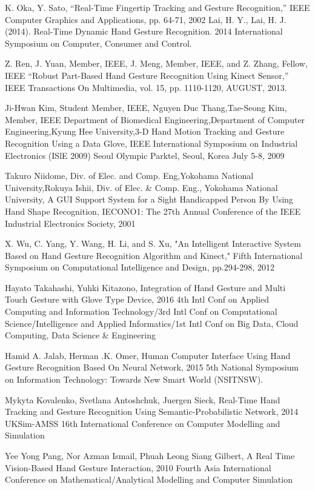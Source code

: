 \documentclass[11pt]{report}
\begin{document}
\begin{thebibliography}{999}

     K. Oka, Y. Sato, “Real-Time Fingertip Tracking and Gesture Recognition,” IEEE Computer Graphics and Applications, pp. 64-71, 2002
     Lai, H. Y., Lai, H. J. (2014). Real-Time Dynamic Hand Gesture Recognition. 2014 International Symposium on Computer, Consumer and Control. 
    
     Z. Ren, J. Yuan, Member, IEEE, J. Meng, Member, IEEE, and Z. Zhang, Fellow, IEEE “Robust Part-Based Hand Gesture Recognition Using Kinect Sensor,” IEEE Transactions On Multimedia, vol. 15, pp. 1110-1120, AUGUST, 2013.
    
     Ji-Hwan Kim, Student Member, IEEE, Nguyen Duc Thang,Tae-Seong Kim, Member, IEEE Department of Biomedical Engineering,Department of Computer Engineering,Kyung Hee University,3-D Hand Motion Tracking and Gesture Recognition
    Using a Data Glove, IEEE International Symposium on Industrial Electronics (ISlE 2009) Seoul Olympic Parktel, Seoul, Korea July 5-8, 2009
    
     Takuro Niidome, Div. of Elec. and Comp. Eng,Yokohama National University,Rokuya Ishii, Div. of Elec. \& Comp. Eng., Yokohama National University, A GUI Support System for a Sight Handicapped Person By Using Hand Shape Recognition, IECONO1: The 27th Annual Conference of the IEEE Industrial Electronics Society, 2001
    
     X. Wu, C. Yang, Y. Wang, H. Li, and S. Xu, "An Intelligent Interactive System Based on Hand Gesture Recognition Algorithm and Kinect," Fifth International Symposium on Computational Intelligence and Design, pp.294-298, 2012
    
     Hayato Takahashi, Yuhki Kitazono, Integration of Hand Gesture and Multi Touch Gesture with Glove Type Device, 2016 4th Intl Conf on Applied Computing and Information Technology/3rd Intl Conf on Computational Science/Intelligence and Applied Informatics/1st Intl Conf on Big Data, Cloud Computing, Data Science \& Engineering
    
     Hamid A. Jalab, Herman .K. Omer, Human Computer Interface Using Hand Gesture Recognition Based On Neural Network, 2015 5th National Symposium on Information Technology: Towards New Smart World (NSITNSW).
    
     Mykyta Kovalenko, Svetlana Antoshchuk, Juergen Sieck, Real-Time Hand Tracking and Gesture Recognition Using Semantic-Probabilistic Network, 2014 UKSim-AMSS 16th International Conference on Computer Modelling and Simulation
    
     Yee Yong Pang, Nor Azman Ismail, Phuah Leong Siang Gilbert, A Real Time Vision-Based Hand Gesture Interaction, 2010 Fourth Asia International Conference on Mathematical/Analytical Modelling and Computer Simulation
    



\end{thebibliography}
\end{document}
